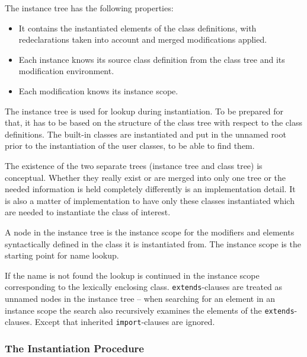 The instance tree has the following properties:
\begin{itemize}
\item
  It contains the instantiated elements of the class definitions, with redeclarations taken into account and merged modifications applied.
\end{itemize}

\begin{itemize}
\item
  Each instance knows its source class definition from the class tree and its modification environment.
\item
  Each modification knows its instance scope.
\end{itemize}

The instance tree is used for lookup during instantiation.
To be prepared for that, it has to be based on the structure of the class tree with respect to the class definitions.
The built-in classes are instantiated and put in the unnamed root prior to the instantiation of the user classes, to be able to find them.

\begin{nonnormative}
The existence of the two separate trees (instance tree and class tree) is conceptual.
Whether they really exist or are merged into only one tree or the needed information is held completely differently is an implementation detail.
It is also a matter of implementation to have only these classes instantiated which are needed to instantiate the class of interest.
\end{nonnormative}

A node in the instance tree is the instance scope for the modifiers and elements syntactically defined in the class it is instantiated from.
The instance scope is the starting point for name lookup.

\begin{nonnormative}
If the name is not found the lookup is continued in the instance scope corresponding to the lexically enclosing class.
\lstinline!extends!-clauses are treated as unnamed nodes in the instance tree -- when searching for an element in an instance scope the search also recursively examines the elements of the \lstinline!extends!-clauses.
Except that inherited \lstinline!import!-clauses are ignored.
\end{nonnormative}


\subsubsection{The Instantiation Procedure}\label{the-instantiation-procedure}

